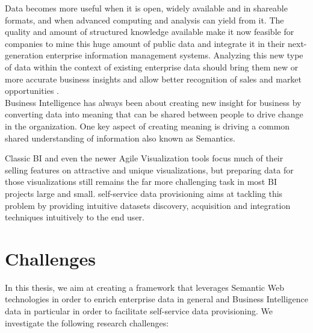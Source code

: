\documentclass[onecolumn, crcready]{iosart2c}
\begin{document}
Data becomes more useful when it is open, widely available and in shareable formats, and when advanced computing and analysis can yield from it. The quality and amount of structured knowledge available make it now feasible for companies to mine this huge amount of public data and integrate it in their next-generation enterprise information management systems. Analyzing this new type of data within the context of existing enterprise data should bring them new or more accurate business insights and allow better recognition of sales and market opportunities \cite{bigData}.\\

Business Intelligence has always been about creating new insight for business by converting data into meaning that can be shared between people to drive change in the organization. One key aspect of creating meaning is driving a common shared understanding of information also known as Semantics.

Classic BI and even the newer Agile Visualization tools focus much of their selling features on attractive and unique visualizations, but preparing data for those visualizations still remains the far more challenging task in most BI projects large and small. self-service data provisioning aims at tackling this problem by providing intuitive datasets discovery, acquisition and integration techniques intuitively to the end user.



\section{Challenges}

In this thesis, we aim at creating a framework that leverages Semantic Web technologies in order to enrich enterprise data in general and Business Intelligence data in particular in order to facilitate self-service data provisioning. We investigate the following research challenges:
\end{document}
